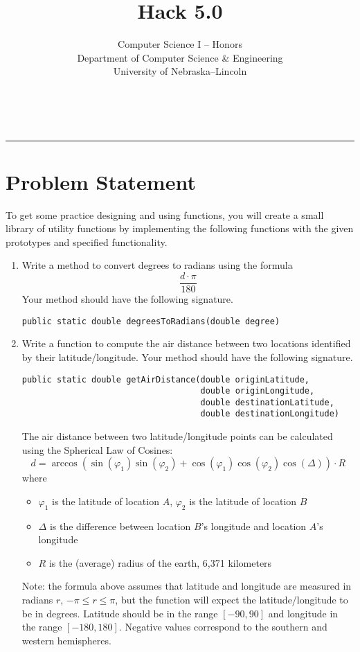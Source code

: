 \documentclass[12pt]{scrartcl}
\title{Hack 5.0}\let\Title\@title
\subtitle{Computer Science I -- Honors\\
{\small
\vskip1cm
Department of Computer Science \& Engineering \\
University of Nebraska--Lincoln}
\vskip-1cm}
\date{~}
\begin{document}
\maketitle

\hrule



\section*{Problem Statement}

To get some practice designing and using functions, you will 
create a small library of utility functions by implementing
the following functions with the given prototypes and specified 
functionality.
\begin{enumerate}
  \item Write a method to convert degrees to radians using the formula 
		$$\frac{d\cdot \pi}{180}$$
	Your method should have the following signature.
	
	\texttt{public static double degreesToRadians(double degree)}
  \item Write a function to compute the air distance between two locations 
    identified by their latitude/longitude. Your method should have the 
    following signature.

\begin{verbatim}
public static double getAirDistance(double originLatitude, 
                                    double originLongitude, 
                                    double destinationLatitude, 
                                    double destinationLongitude)
\end{verbatim}  
The air distance between two latitude/longitude points can be calculated 
using the Spherical Law of Cosines:
 $$d = \arccos{(\sin(\varphi_1) \sin(\varphi_2) + \cos(\varphi_1) \cos(\varphi_2) \cos(\Delta) )} \cdot R$$
where
\begin{itemize}
  \item $\varphi_1$ is the latitude of location $A$, $\varphi_2$ is the latitude of location $B$
  \item $\Delta$ is the difference between location $B$'s longitude and location $A$'s longitude
  \item $R$ is the (average) radius of the earth, 6,371 kilometers
\end{itemize}
Note: the formula above assumes that latitude and longitude are measured 
in radians $r$, $-\pi \leq r \leq \pi$, but the function will expect 
the latitude/longitude to be in degrees.  Latitude should be in the range 
$[-90, 90]$ and longitude in the range $[-180, 180]$.  Negative values 
correspond to the southern and western hemispheres.


\end{enumerate}
\end{document}
